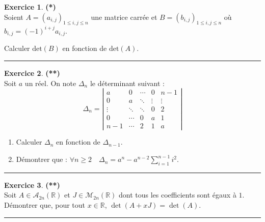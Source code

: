 \documentclass[a4paper,11pt]{article}
\theoremstyle{definition}
\newtheorem{exo}{Exercice} %
\begin{document}
\begin{minipage}{1\linewidth}\begin{minipage}[t]{0.48\linewidth}\raggedright
		
				\begin{exo}\textbf{(*)}\quad\\[0.2cm]
			Soient $A=(a_{i,j})_{1\leqslant i,j\leqslant n}$ une matrice carrée et $B= (b_{i,j})_{1\leqslant i,j\leqslant n}$ où $b_{i,j}=(-1)^{i+j}a_{i,j}$. 
			
			Calculer $\text{det}(B)$ en fonction de $\text{det}(A)$. 
			
			\centering\rule{1\linewidth}{0.6pt}\end{exo}
		
				\begin{exo}\textbf{(**)}\quad\\[0.2cm]
			Soit $a$ un réel.
			On note $\Delta_n$ le déterminant suivant : 
			$$
			\Delta_n = 
			\left\vert
			\begin{matrix}
			a   &    0   & \cdots & 0      & n-1 \\
			0   &    a   & \ddots & \vdots & \vdots \\
			\vdots & \ddots & \ddots & 0      & 2 \\
			0   & \cdots &   0    & a      & 1 \\
			n-1  & \cdots &   2    & 1      & a
			\end{matrix}
			\right\vert
			$$
			\begin{enumerate}
				\item Calculer $\Delta_n$ en fonction de $\Delta_{n-1}$.
				\item Démontrer que : $\displaystyle \forall n\geq2\quad
				\Delta_n=a^n-a^{n-2}\sum_{i=1}^{n-1}{i^2}$.
			\end{enumerate}
			
			
			\centering\rule{1\linewidth}{0.6pt}\end{exo}
		

		
		
		
		\begin{exo}\textbf{(**)}\quad\\[0.2cm]
			Soit $A\in\mathcal A_{2n}(\mathbb R)$ et $J\in\mathcal M_{2n}(\mathbb R)$ dont tous les coefficients sont égaux à $1$. Démontrer que, pour tout $x\in\mathbb R$, $\det(A+xJ)=\det(A)$.
			
			\centering\rule{1\linewidth}{0.6pt}\end{exo}
		

\end{minipage}
\end{minipage}
\end{document}
